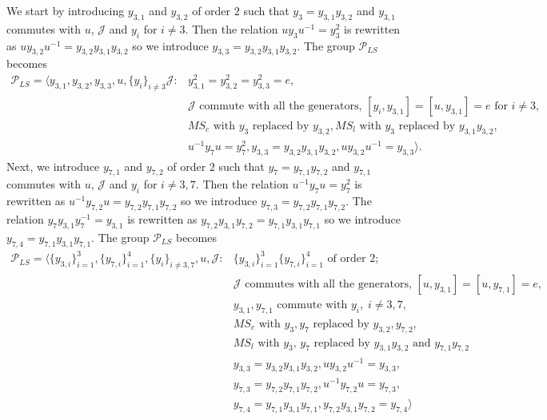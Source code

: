 \documentclass[11pt,letterpaper]{article}
\newcommand{\1}{\mathbb{1}}
\newcommand{\Pg}{\mathcal{P}}
\newcommand{\J}{\mathcal{J}}
\newcommand{\MS}{MS}
\newcommand{\LS}{LS}
\theoremstyle{definition}
\begin{document}
We start by introducing $y_{3,1}$ and $y_{3,2}$ of order $2$ such that $y_3 = y_{3,1}y_{3,2}$ 
and $y_{3,1}$ commutes with $u$, $\J$ and $y_i$ for $ i \neq 3$.
Then the relation $uy_3u^{-1} = y_3^2$ is rewritten as $uy_{3,2}u^{-1} = y_{3,2}y_{3,1}y_{3,2}$ so we introduce $y_{3,3} = y_{3,2}y_{3,1}y_{3,2}$.
The group $\Pg_{\LS}$ becomes
\begin{equation}
\begin{aligned}
	\Pg_{\LS} = \langle y_{3,1}, y_{3,2}, y_{3,3}, u, \{y_i\}_{i \neq 3} \J: &y_{3,1}^2 = y_{3,2}^2 = y_{3,3}^2 =e,\\
	&\J \text{ commute with  all the generators, } [y_i,y_{3,1}] = [u,y_{3,1}] =  e \text{ for } i \neq 3,\\
	&\MS_c \text{ with $y_3$ replaced by $y_{3,2}$},
	\MS_l \text{ with $y_3$ replaced by $y_{3,1}y_{3,2}$},\\
	& u^{-1}y_7u = y_7^2, 
	y_{3,3} = y_{3,2}y_{3,1}y_{3,2}, uy_{3,2}u^{-1} = y_{3,3}\rangle.
\end{aligned}
\end{equation}
Next, we introduce $y_{7,1}$ and $y_{7,2}$ of order $2$ such that $y_7 = y_{7,1}y_{7,2}$ and 
$y_{7,1}$ commutes with $u$, $\J$ and $y_i$ for $i \neq 3,7$.
Then the relation $u^{-1}y_7u = y_7^2$ is rewritten as $u^{-1}y_{7,2}u = y_{7,2}y_{7,1}y_{7,2}$ so we introduce $y_{7,3} = y_{7,2}y_{7,1}y_{7,2}$.
The relation $y_7y_{3,1}y_7^{-1} = y_{3,1}$ is rewritten as $y_{7,2}y_{3,1}y_{7,2} = y_{7,1}y_{3,1}y_{7,1}$ so we introduce $y_{7,4} = y_{7,1}y_{3,1}y_{7,1}$.
The group $\Pg_{\LS}$ becomes
\begin{equation}
\begin{aligned}
	\Pg_{\LS} = \langle \{y_{3,i}\}_{i=1}^3, \{ y_{7,i} \}_{i=1}^4, \{y_i\}_{i\neq 3, 7}, u, \J: &\{y_{3,i}\}_{i=1}^3 \{y_{7,i}\}_{i=1}^4 \text{ of order } 2;\\
	&\J \text{ commutes with all the generators, } [u, y_{3,1}] = [u, y_{7,1}] = e,\\
	&y_{3,1}, y_{7,1} \text{ commute with } y_i,\; i \neq 3,7,\\
	& \MS_c \text{ with $y_3, y_7$ replaced by $y_{3,2}, y_{7,2}$},\\
	& \MS_l \text{ with $y_3$, $y_7$ replaced by $y_{3,1}y_{3,2}$ and $y_{7,1}y_{7,2}$} \\
	&y_{3,3} = y_{3,2}y_{3,1}y_{3,2}, uy_{3,2}u^{-1} = y_{3,3}, \\
	&y_{7,3} = y_{7,2}y_{7,1}y_{7,2}, u^{-1}y_{7,2}u = y_{7,3},\\
	&y_{7,4} = y_{7,1}y_{3,1}y_{7,1}, y_{7,2}y_{3,1}y_{7,2} = y_{7,4} \rangle
\end{aligned}
\end{equation}
\end{document}
